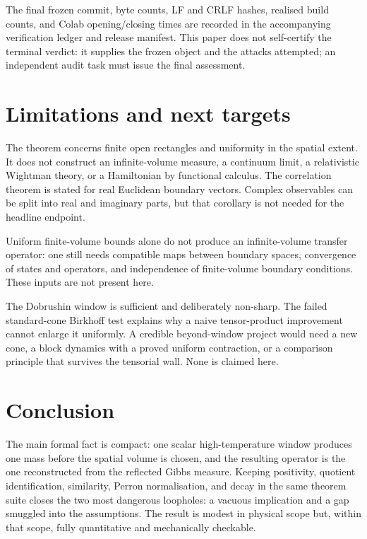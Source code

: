 \documentclass[11pt]{article}
\begin{document}
The final frozen commit, byte counts, LF and CRLF hashes, realised build
counts, and Colab opening/closing times are recorded in the accompanying
verification ledger and release manifest.  This paper does not self-certify
the terminal verdict: it supplies the frozen object and the attacks attempted;
an independent audit task must issue the final assessment.

\section{Limitations and next targets}
\label{sec:limits}

The theorem concerns finite open rectangles and uniformity in the spatial
extent.  It does not construct an infinite-volume measure, a continuum limit,
a relativistic Wightman theory, or a Hamiltonian by functional calculus.  The
correlation theorem is stated for real Euclidean boundary vectors.  Complex
observables can be split into real and imaginary parts, but that corollary is
not needed for the headline endpoint.

Uniform finite-volume bounds alone do not produce an infinite-volume transfer
operator: one still needs compatible maps between boundary spaces, convergence
of states and operators, and independence of finite-volume boundary
conditions.  These inputs are not present here.

The Dobrushin window is sufficient and deliberately non-sharp.  The failed
standard-cone Birkhoff test explains why a naive tensor-product improvement
cannot enlarge it uniformly.  A credible beyond-window project would need a
new cone, a block dynamics with a proved uniform contraction, or a comparison
principle that survives the tensorial wall.  None is claimed here.

\section*{Conclusion}

The main formal fact is compact: one scalar high-temperature window produces
one mass before the spatial volume is chosen, and the resulting operator is
the one reconstructed from the reflected Gibbs measure.  Keeping positivity,
quotient identification, similarity, Perron normalisation, and decay in the
same theorem suite closes the two most dangerous loopholes: a vacuous
implication and a gap smuggled into the assumptions.  The result is modest in
physical scope but, within that scope, fully quantitative and mechanically
checkable.
\end{document}
